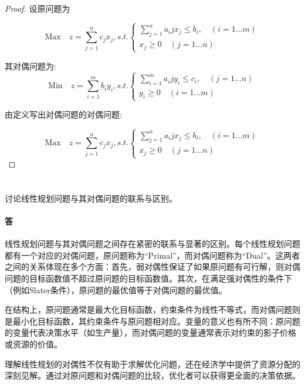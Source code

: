 \documentclass[a4paper]{article}
\begin{document}
\begin{proof}
设原问题为

\[\text{Max}\quad z = \sum_{j=1}^n c_jx_j, s.t. \left\{\begin{aligned}
    \sum_{j=1}^n a_ij x_j \leq b_i, \quad (i = 1 ... m) \\
    x_j \geq 0 \quad (j = 1 ... n)
\end{aligned}\right.\]

其对偶问题为:
\[\text{Min}\quad z = \sum_{i=1}^m b_iy_i, s.t. \left\{\begin{aligned}
    \sum_{i=1}^m a_ij y_i \leq c_i, \quad (j = 1 ... n) \\
    y_i \geq 0 \quad (i = 1 ... m)
\end{aligned}\right.\]

由定义写出对偶问题的对偶问题:

\[\text{Max}\quad z = \sum_{j=1}^n c_jx_j, s.t. \left\{\begin{aligned}
    \sum_{j=1}^n a_ij x_j \leq b_i, \quad (i = 1 ... m) \\
    x_j \geq 0 \quad (j = 1 ... n)
\end{aligned}\right.\]

\end{proof}


\section{}
讨论线性规划问题与其对偶问题的联系与区别。
\paragraph{答}

线性规划问题与其对偶问题之间存在紧密的联系与显著的区别。每个线性规划问题都有一个对应的对偶问题，原问题称为“Primal”，而对偶问题称为“Dual”。这两者之间的关系体现在多个方面：首先，弱对偶性保证了如果原问题有可行解，则对偶问题的目标函数值不超过原问题的目标函数值。其次，在满足强对偶性的条件下（例如Slater条件），原问题的最优值等于对偶问题的最优值。

在结构上，原问题通常是最大化目标函数，约束条件为线性不等式，而对偶问题则是最小化目标函数，其约束条件与原问题相对应。变量的意义也有所不同：原问题的变量代表决策水平（如生产量），而对偶问题的变量通常表示对约束的影子价格或资源的价值。

理解线性规划的对偶性不仅有助于求解优化问题，还在经济学中提供了资源分配的深刻见解。通过对原问题和对偶问题的比较，优化者可以获得更全面的决策依据。
\end{document}
